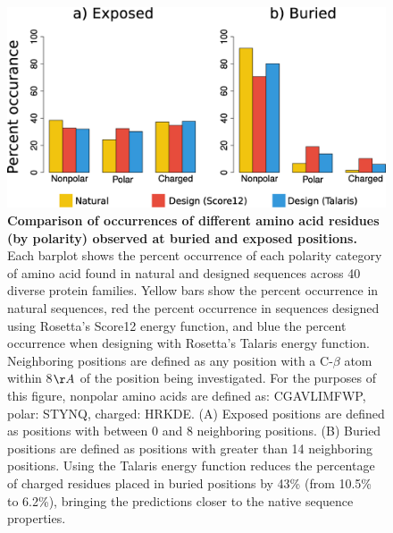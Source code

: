\begin{figure}[H]
  \centering
  \includegraphics[width=\textwidth,keepaspectratio]{figures/benchmark-fig-s1.eps}
  \caption[Comparison of occurrences of different amino acid residues (by polarity) observed at buried and exposed positions]{
    \textbf{Comparison of occurrences of different amino acid residues (by polarity) observed at buried and exposed positions.}
    Each barplot shows the percent occurrence of each polarity category of amino acid found in natural and designed sequences across 40 diverse protein families. Yellow bars show the percent occurrence in natural sequences, red the percent occurrence in sequences designed using Rosetta’s Score12 energy function, and blue the percent occurrence when designing with Rosetta’s Talaris energy function. Neighboring positions are defined as any position with a C-$\beta$ atom within 8$\AA$ of the position being investigated. For the purposes of this figure, nonpolar amino acids are defined as: CGAVLIMFWP, polar: STYNQ, charged: HRKDE. (A) Exposed positions are defined as positions with between 0 and 8 neighboring positions. (B) Buried positions are defined as positions with greater than 14 neighboring positions. Using the Talaris energy function reduces the percentage of charged residues placed in buried positions by 43\% (from 10.5\% to 6.2\%), bringing the predictions closer to the native sequence properties.
  }
  \label{fig:benchmark-burial-exposed}
\end{figure}
